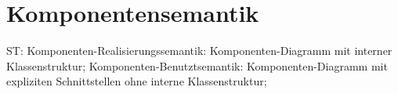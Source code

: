 \chapter{Komponentensemantik}
ST: Komponenten-Realisierungssemantik: Komponenten-Diagramm mit
interner Klassenstruktur;
Komponenten-Benutztsemantik: Komponenten-Diagramm mit expliziten
Schnittstellen ohne interne Klassenstruktur;
